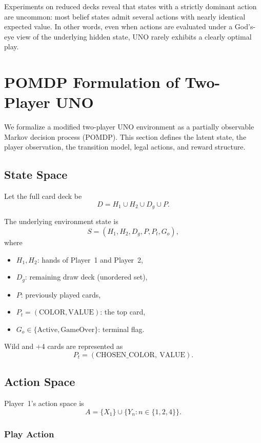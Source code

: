 \documentclass[journal,transmag]{IEEEtran}
\begin{document}
Experiments on reduced decks reveal that states with a strictly dominant action are uncommon: most belief states admit several actions with nearly identical expected value. In other words, even when actions are evaluated under a God’s-eye view of the underlying hidden state, UNO rarely exhibits a clearly optimal play. 



\section{POMDP Formulation of Two-Player UNO}

We formalize a modified two-player UNO environment as a partially observable
Markov decision process (POMDP). This section defines the latent state,
the player observation, the transition model, legal actions, and reward
structure.

\subsection{{State Space}}

Let the full card deck be
\[
D = H_1 \cup H_2 \cup D_g \cup P.
\]

The underlying environment state is
\[
S = (H_1, H_2, D_g, P, P_t, G_o),
\]
where
\begin{itemize}
    \item $H_1, H_2$: hands of Player~1 and Player~2,
    \item $D_g$: remaining draw deck (unordered set),
    \item $P$: previously played cards,
    \item $P_t = (\text{COLOR}, \text{VALUE})$: the top card,
    \item $G_o \in \{\text{Active}, \text{GameOver}\}$: terminal flag.
\end{itemize}

Wild and +4 cards are represented as
\[
P_t = (\text{CHOSEN\_COLOR},\ \text{VALUE}).
\]

\subsection{Action Space}

Player~1’s action space is
\[
A = \{X_1\} \cup \{Y_n : n \in \{1,2,4\}\}.
\]

\subsubsection{Play Action}
\end{document}
